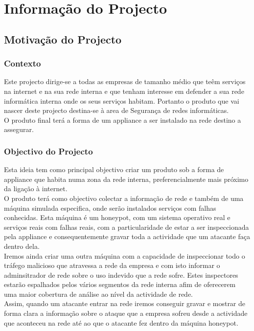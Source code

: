 \chapter{Informação do Projecto}
\minitoc
\section{Motivação do Projecto}
\subsection{Contexto}
Este projecto dirige-se a todas as empresas de tamanho médio que teêm serviços na internet e na sua rede interna e que
tenham interesse em defender a sua rede informática interna onde os seus serviços habitam.
Portanto o produto que vai nascer deste projecto destina-se à area de Segurança de redes informáticas.\\
O produto final terá a forma de um appliance a ser instalado na rede destino a assegurar.


\subsection{Objectivo do Projecto}
Esta ideia tem como principal objectivo criar um produto sob a forma de appliance
que habita numa zona da rede interna, preferencialmente mais próximo da ligação à internet.\\
O produto terá como objectivo colectar a informação de rede e também de uma máquina simulada especifica, onde serão instalados serviços com falhas conhecidas.
Esta máquina é um honeypot, com um sistema operativo real e serviços reais com falhas reais, com a particularidade de estar a ser inspeccionada
pela appliance e consequentemente gravar toda a actividade que um atacante faça dentro dela.\\
Iremos ainda criar uma outra máquina com a capacidade de inspeccionar todo o tráfego malicioso que atravessa a rede da empresa e com isto informar o
adminsitrador de rede sobre o uso indevido que a rede sofre. Estes inspectores estarão espalhados pelos vários segmentos da rede interna afim de 
oferecerem uma maior cobertura de análise ao nível da actividade de rede.\\
Assim, quando um atacante entrar na rede iremos conseguir gravar e mostrar de forma clara a informação sobre o ataque que a empresa sofreu desde a actividade
que aconteceu na rede até ao que o atacante fez dentro da máquina honeypot.\\

